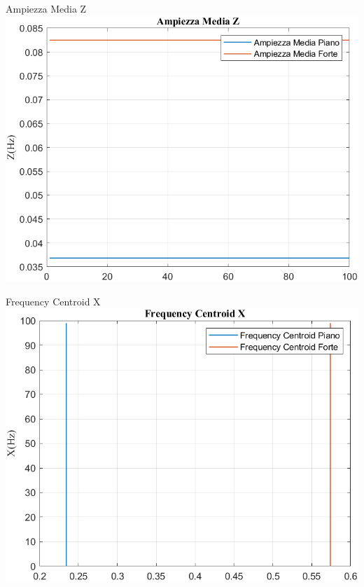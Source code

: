 	\begin{frame}{{Ampiezza Media Z}}					
		\centering\includegraphics[height=.8\textheight]{figure/Acc/Trasformata/Ampiezza MediaZ}
	\end{frame}
	
	\begin{frame}{{Frequency Centroid X}}
		\centering\includegraphics[height=.8\textheight]{figure/Acc/Trasformata/Frequency CentroidX}
	\end{frame}
	
